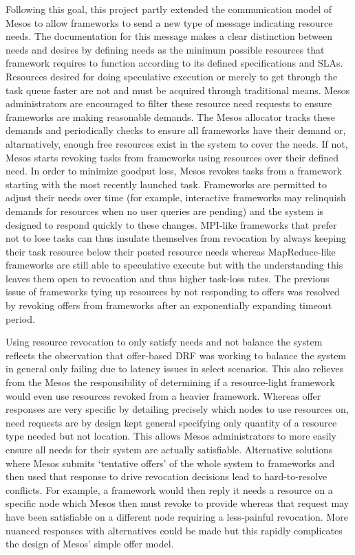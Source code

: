 Following this goal, this project partly extended the communication model of Mesos to allow
frameworks to send a new type of message indicating resource needs. The documentation for this
message makes a clear distinction between needs and desires by defining needs as the minimum
possible resources that framework requires to function according to its defined specifications
and SLAs. Resources desired for doing speculative execution or merely to get through the task
queue faster are not and must be acquired through traditional means. Mesos administrators are
encouraged to filter these resource need requests to ensure frameworks are making reasonable
demands. The Mesos allocator tracks these demands and periodically checks to ensure all
frameworks have their demand or, altarnatively, enough free resources exist in the system to
cover the needs. If not, Mesos starts revoking tasks from frameworks using resources over their
defined need. In order to minimize goodput loss, Mesos revokes tasks from a framework starting
with the most recently launched task. Frameworks are permitted to adjust their needs over time
(for example, interactive frameworks may relinquish demands for resources when no user queries
are pending) and the system is designed to respond quickly to these changes. MPI-like
frameworks that prefer not to lose tasks can thus insulate themselves from revocation by always
keeping their task resource below their posted resource needs whereas MapReduce-like frameworks
are still able to speculative execute but with the understanding this leaves them open to
revocation and thus higher task-loss rates. The previous issue of frameworks tying up resources
by not responding to offers was resolved by revoking offers from frameworks after an
exponentially expanding timeout period.

Using resource revocation to only satisfy needs and not balance the system reflects the
observation that offer-based DRF was working to balance the system in general only failing due
to latency issues in select scenarios. This also relieves from the Mesos the responsibility of
determining if a resource-light framework would even use resources revoked from a heavier
framework. Whereas offer responses are very specific by detailing precisely which nodes to use
resources on, need requests are by design kept general specifying only quantity of a resource
type needed but not location. This allows Mesos administrators to more easily ensure all needs
for their system are actually satisfiable. Alternative solutions where Mesos submits `tentative
offers' of the whole system to frameworks and then used that response to drive revocation
decisions lead to hard-to-resolve conflicts. For example, a framework would then reply it needs
a resource on a specific node which Mesos then must revoke to provide whereas that request may
have been satisfiable on a different node requiring a less-painful revocation. More nuanced
responses with alternatives could be made but this rapidly complicates the design of Mesos'
simple offer model.

